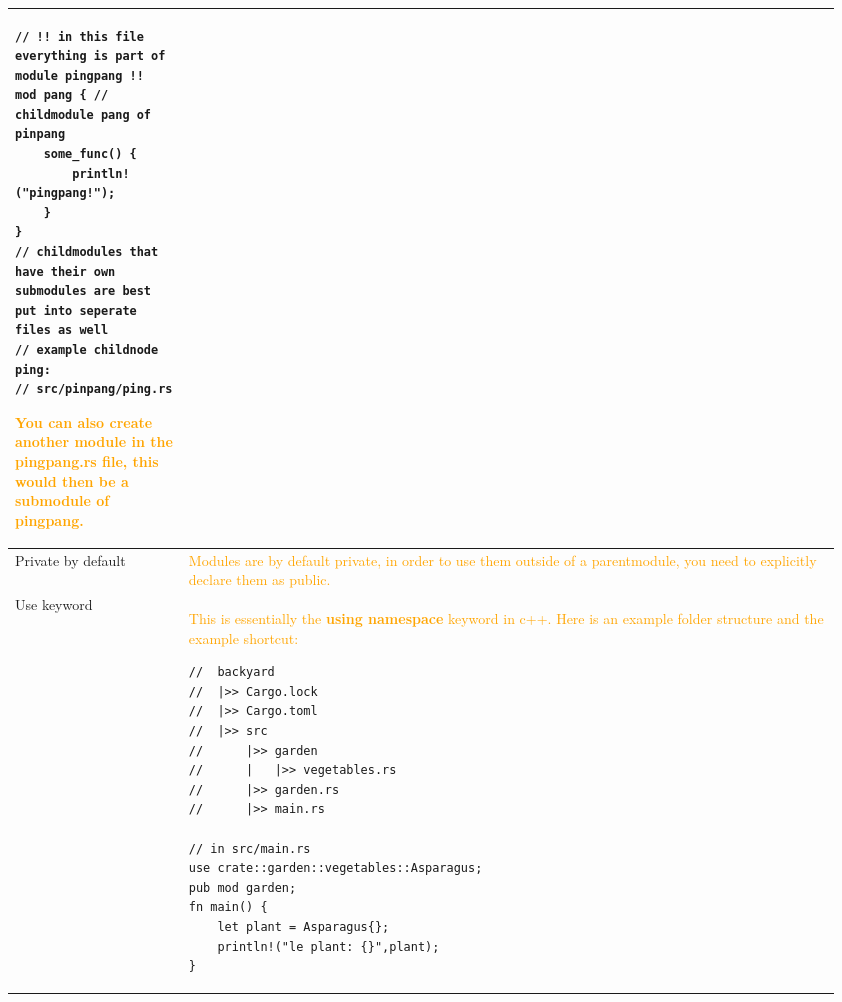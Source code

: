 \documentclass[main.tex,fontsize=8pt,paper=a4,paper=portrait,DIV=calc,]{scrartcl}
\begin{document}
\begin{table}[ht!]
\begin{tabular}{|m{0.2\linewidth}|m{0.755\linewidth}|}
\begin{lstlisting}
// !! in this file everything is part of module pingpang !!
mod pang { // childmodule pang of pinpang
    some_func() {
        println!("pingpang!");
    }
}
// childmodules that have their own submodules are best put into seperate files as well
// example childnode ping:
// src/pinpang/ping.rs
\end{lstlisting}
\textcolor{orange}{You can also create another module in the pingpang.rs file, this would then be a submodule of pingpang.}\\
\hline
Private by default & 
\textcolor{orange}{Modules are by default private, in order to use them outside of a parentmodule, you need to explicitly declare them as public.}\\
\hline
Use keyword & 
\textcolor{orange}{This is essentially the \textbf{using namespace} keyword in c++.\newline
Here is an example folder structure and the example shortcut:}\newline
\begin{lstlisting}
//  backyard
//  |>> Cargo.lock
//  |>> Cargo.toml
//  |>> src
//      |>> garden
//      |   |>> vegetables.rs
//      |>> garden.rs
//      |>> main.rs

// in src/main.rs
use crate::garden::vegetables::Asparagus;
pub mod garden;
fn main() {
    let plant = Asparagus{};
    println!("le plant: {}",plant);
}
\end{lstlisting}\\
\hline
\end{tabular}
\end{table}
\pagebreak
\end{document}
